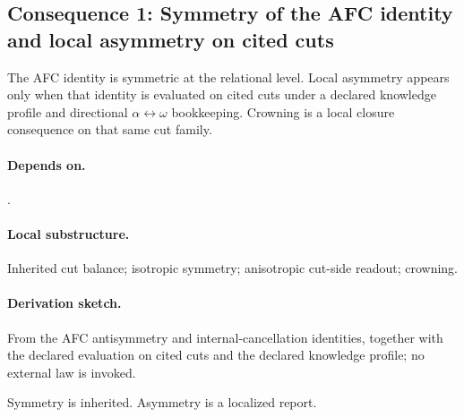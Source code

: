 \subsection{Consequence 1: Symmetry of the AFC identity and local asymmetry on cited cuts}
\begin{consequence}\label{cons:c1}
The AFC identity is symmetric at the relational level. Local asymmetry appears only when that identity is evaluated on cited cuts under a declared knowledge profile and directional $\alpha\leftrightarrow\omega$ bookkeeping. Crowning is a local closure consequence on that same cut family.
\end{consequence}
\paragraph{Depends on.} .
\paragraph{Local substructure.} Inherited cut balance; isotropic symmetry; anisotropic cut-side readout; crowning.
\paragraph{Derivation sketch.} From the AFC antisymmetry and internal-cancellation identities, together with the declared evaluation on cited cuts and the declared knowledge profile; no external law is invoked.
\begin{remarkx}
Symmetry is inherited. Asymmetry is a localized report.
\end{remarkx}
